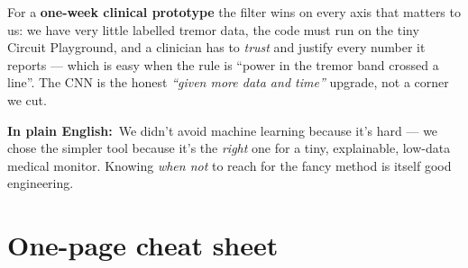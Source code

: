 \documentclass[11pt]{article}
\newcommand{\pe}{\textbf{\color{teal}In plain English:}\ }
\begin{document}
\noindent For a \textbf{one-week clinical prototype} the filter wins on every
axis that matters to us: we have very little labelled tremor data, the code must
run on the tiny Circuit Playground, and a clinician has to \emph{trust} and
justify every number it reports --- which is easy when the rule is ``power in
the tremor band crossed a line''. The CNN is the honest \emph{``given more data
and time''} upgrade, not a corner we cut.

\begin{plain}
\pe We didn't avoid machine learning because it's hard --- we chose the simpler
tool because it's the \emph{right} one for a tiny, explainable, low-data medical
monitor. Knowing \emph{when not} to reach for the fancy method is itself good
engineering.
\end{plain}

\section{One-page cheat sheet}
\end{document}
